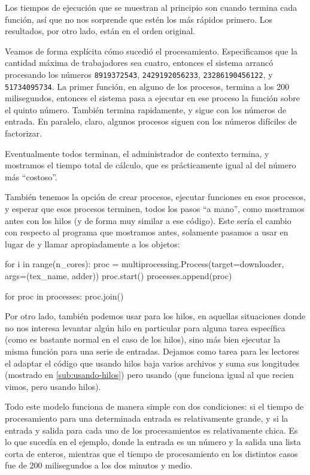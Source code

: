 Los tiempos de ejecución que se muestran al principio son cuando termina cada función, así que no nos sorprende que estén los más rápidos primero. Los resultados, por otro lado, están en el orden original.

Veamos de forma explícita cómo sucedió el procesamiento. Especificamos que la cantidad máxima de trabajadores sea cuatro, entonces el sistema arrancó procesando los números \texttt{8919372543}, \texttt{2429192056233}, \texttt{23286190456122}, y \texttt{51734095734}. La primer función, en alguno de los procesos, termina a los 200 milisegundos, entonces el sistema pasa a ejecutar en ese proceso la función sobre el quinto número. También termina rapidamente, y sigue con los números de entrada. En paralelo, claro, algunos procesos siguen con los números difíciles de factorizar.

Eventualmente todos terminan, el administrador de contexto termina, y mostramos el tiempo total de cálculo, que es prácticamente igual al del número más ``costoso''.

También tenemos la opción de crear procesos, ejecutar funciones en esos procesos, y esperar que esos procesos terminen, todos los pasos ``a mano'', como mostramos antes con los hilos (y de forma muy similar a ese código). Este sería el cambio con respecto al programa que mostramos antes, solamente pasamos a usar  en lugar de  y llamar apropiadamente a los objetos:

\begin{py}
for i in range(n_cores):
    proc = multiprocessing.Process(target=downloader, args=(tex_name, adder))
    proc.start()
    processes.append(proc)

for proc in processes:
    proc.join()
\end{py}

Por otro lado, también podemos usar  para los hilos, en aquellas situaciones donde no nos interesa levantar algún hilo en particular para alguna tarea específica (como es bastante normal en el caso de los hilos), sino más bien ejecutar la misma función para una serie de entradas. Dejamos como tarea para les lectores el adaptar el código que usando hilos baja varios archivos y suma sus longitudes (mostrado en \ref{sub:usando-hilos}) pero usando  (que funciona igual al  que recien vimos, pero usando hilos).

Todo este modelo funciona de manera simple con dos condiciones: si el tiempo de procesamiento para una determinada entrada es relativamente grande, y si la entrada y salida para cada uno de los procesamientos es relativamente chica. Es lo que sucedía en el ejemplo, donde la entrada es un número y la salida una lista corta de enteros, mientras que el tiempo de procesamiento en los distintos casos fue de 200 milisegundos a los dos minutos y medio.

